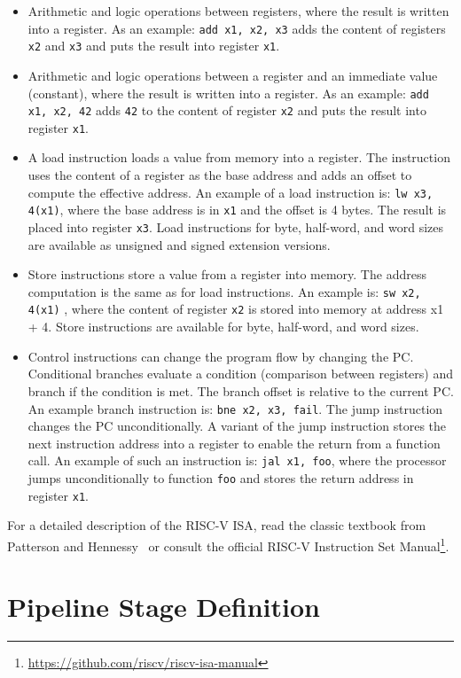 \documentclass[%
    10pt,
    headinclude, footexclude,
    openright, %
    notitlepage,
    cleardoubleempty,
    headsepline,
    pointlessnumbers,
    bibtotoc, idxtotoc,
    ]{scrbook}
\newcommand{\code}[1]{{\lstinline[basicstyle=\small\ttfamily]{#1}}}
\newcommand{\myref}[2]{\href{#1}{#2}}
\renewcommand{\myref}[2]{{#2}{\footnote{\url{#1}}}}
\begin{document}
\begin{itemize}
\item Arithmetic and logic operations between registers, where the result is written into a register.
As an example: \code{add x1, x2, x3} adds the content of registers \code{x2} and \code{x3} and
puts the result into register \code{x1}.
\item Arithmetic and logic operations between a register and an immediate value (constant),
where the result is written into a register.
As an example: \code{add x1, x2, 42} adds \code{42} to the content of register \code{x2} and
puts the result into register \code{x1}.
\item A load instruction loads a value from memory into a register. The instruction uses the content
of a register as the base address and adds an offset to compute the effective address.
An example of a load instruction is: \code{lw x3, 4(x1)}, where the base address is in \code{x1}
and the offset is 4 bytes. The result is placed into register \code{x3}. Load instructions
for byte, half-word, and word sizes are available as unsigned and signed extension versions.
\item Store instructions store a value from a register into memory. The address computation is
the same as for load instructions. An example is: \code{sw x2, 4(x1)} , where the content of
register \code{x2} is stored into memory at address {x1 + 4}. Store instructions are
available for byte, half-word, and word sizes.
\item Control instructions can change the program flow by changing the PC.
Conditional branches evaluate a condition (comparison between registers) and branch if
the condition is met. The branch offset is relative to the current PC. An example branch
instruction is: \code{bne x2, x3, fail}.
The jump instruction changes the PC unconditionally.
A variant of the jump instruction stores the next instruction address into a register to
enable the return from a function call. An example of such an instruction is:
\code{jal x1, foo}, where the processor jumps unconditionally to function \code{foo}
and stores the return address in register \code{x1}.
\end{itemize}

For a detailed description of the RISC-V ISA, read the classic textbook from Patterson and
Hennessy~\cite{Patterson20} or consult the official
\myref{https://github.com/riscv/riscv-isa-manual}{RISC-V Instruction Set Manual}.

\section{Pipeline Stage Definition}
\end{document}
